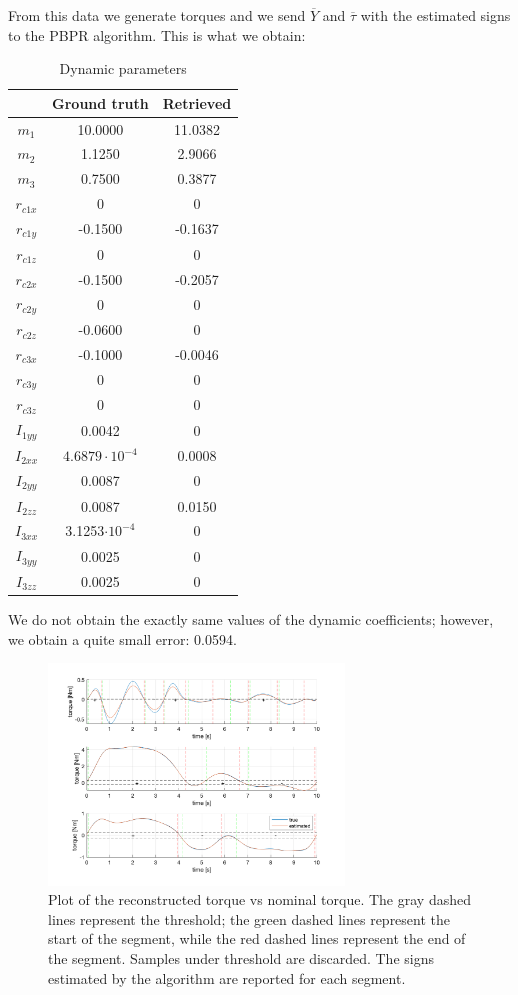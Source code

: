 \documentclass{article}
\begin{document}
From this data we generate torques and we send $\overline{Y}$ and $\overline{\tau}$ with the estimated signs to the PBPR algorithm. This is what we obtain:

\begin{table}[!htbp]
\centering
\begin{tabular}{|c|cc|}
\hline
& Ground truth & Retrieved\\ 
\hline
$m_1$ & 10.0000 & 11.0382\\
$m_2$ & 1.1250 & 2.9066\\
$m_3$ & 0.7500 & 0.3877\\
$r_{c1x}$ &  0 & 0\\
$r_{c1y}$ & -0.1500 & -0.1637\\
$r_{c1z}$ & 0 & 0\\
$r_{c2x}$ & -0.1500 & -0.2057\\
$r_{c2y}$ & 0 & 0\\
$r_{c2z}$ & -0.0600 & 0\\
$r_{c3x}$ & -0.1000 & -0.0046\\
$r_{c3y}$ & 0 & 0\\
$r_{c3z}$ & 0 & 0\\
$I_{1yy}$ & 0.0042 & 0\\
$I_{2xx}$ & $4.6879\cdot 10^{-4}$ & 0.0008\\
$I_{2yy}$ & 0.0087 & 0\\
$I_{2zz}$ & 0.0087 & 0.0150\\
$I_{3xx}$ & 3.1253$\cdot 10^{-4}$ & 0\\
$I_{3yy}$ & 0.0025 & 0\\
$I_{3zz}$ & 0.0025 & 0\\
\hline
\end{tabular}
\caption{Dynamic parameters}
\end{table}
\FloatBarrier

We do not obtain the exactly same values of the dynamic coefficients; however, we obtain a quite small error: 0.0594.

\begin{figure}[!htbp]
\centering
\includegraphics[width=0.7\textwidth]{images/3-dof/results1.png}
\caption{Plot of the reconstructed torque vs nominal torque. The gray dashed lines represent the threshold; the green dashed lines represent the start of the segment, while the red dashed lines represent the end of the segment. Samples under threshold are discarded. The signs estimated by the algorithm are reported for each segment.}
\end{figure}
\FloatBarrier
\end{document}
